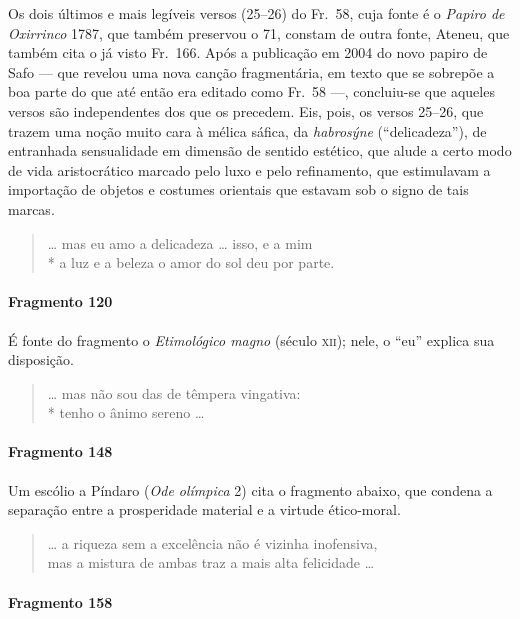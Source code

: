 {{\small Os dois últimos e mais legíveis versos (25--26) do Fr.~58, cuja fonte é o
\textit{Papiro de Oxirrinco }1787, que também preservou o 71, constam de outra
fonte, Ateneu, que também cita o já visto Fr.~166. Após a publicação em 2004 do
novo papiro de Safo --- que revelou uma nova canção fragmentária, em texto que se
sobrepõe a boa parte do que até então era editado como Fr.~58 ---, concluiu-se que aqueles
versos são independentes dos que os precedem. Eis, pois, os versos 25--26, que
trazem uma noção muito cara à mélica sáfica, da \textit{habrosýne}
(``delicadeza”), de entranhada sensualidade em dimensão de sentido
estético, que alude a certo modo de vida aristocrático marcado pelo luxo e pelo
refinamento, que estimulavam a importação de objetos e costumes orientais que
estavam sob o signo de tais marcas.}

\begin{verse}
\ldots{} mas eu amo a delicadeza \ldots{} isso, e a mim \\*
a luz e a beleza o amor do sol deu por parte.
\end{verse}

\paragraph{Fragmento 120}

{\small É fonte do fragmento o \textit{Etimológico magno} (século \textsc{xii}); nele, o “eu”
explica sua disposição.}

\begin{verse}
\ldots{} mas não sou das de têmpera vingativa:\\*
tenho o ânimo sereno \ldots{}
\end{verse}

\paragraph{Fragmento 148}

{\small Um escólio a Píndaro (\textit{Ode olímpica} 2) cita o fragmento abaixo,
que condena a separação entre a prosperidade material e a virtude ético-moral.}

\begin{verse}
\ldots{} a riqueza sem a excelência não é vizinha inofensiva,\\
mas a mistura de ambas traz a mais alta felicidade \ldots{}
\end{verse}

\paragraph{Fragmento 158}

}
